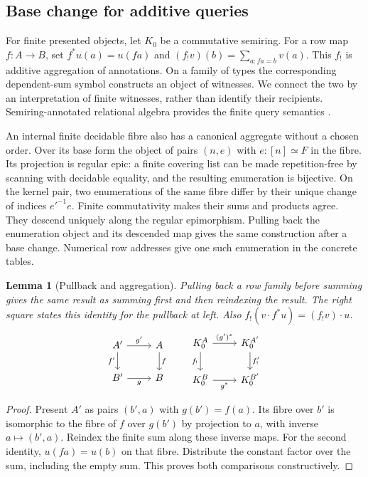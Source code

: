 \documentclass[11pt,a4paper]{article}
\newtheorem{lemma}[lemma]{Lemma}
\theoremstyle{definition}
\theoremstyle{remark}\newaliascnt{remark}{theorem}
\numberwithin{equation}{section}
\begin{document}
\subsection{Base change for additive queries}

For finite presented objects, let \(K_0\) be a commutative semiring. For a row map \(f:A\to B\), set \(f^*u(a)=u(fa)\) and
\((f_!v)(b)=\sum_{a:fa=b}v(a)\).
This \(f_!\) is additive aggregation of annotations. On a family of types the corresponding dependent-sum symbol constructs an object of witnesses. We connect the two by an interpretation of finite witnesses, rather than identify their recipients. Semiring-annotated relational algebra provides the finite query semantics \cite{green-provenance}.

An internal finite decidable fibre also has a canonical aggregate without a chosen order. Over its base form the object of pairs $(n,e)$ with $e:[n]\simeq F$ in the fibre. Its projection is regular epic: a finite covering list can be made repetition-free by scanning with decidable equality, and the resulting enumeration is bijective. On the kernel pair, two enumerations of the same fibre differ by their unique change of indices $e'^{-1}e$. Finite commutativity makes their sums and products agree. They descend uniquely along the regular epimorphism. Pulling back the enumeration object and its descended map gives the same construction after a base change. Numerical row addresses give one such enumeration in the concrete tables.

\begin{lemma}[Pullback and aggregation]\label{lem:bc}
Pulling back a row family before summing gives the same result as summing first and then reindexing the result. The right square states this identity for the pullback at left. Also \(f_!(v\cdot f^*u)=(f_!v)\cdot u\).
\[
\begin{tikzcd}
 A' \arrow[r,"g'"]\arrow[d,"f'"']& A\arrow[d,"f"]\\
 B'\arrow[r,"g"']&B
\end{tikzcd}
\qquad
\begin{tikzcd}
 K_0^{A}\arrow[r,"(g')^*"]\arrow[d,"f_!"']&
 K_0^{A'}\arrow[d,"f'_!"]\\
 K_0^{B}\arrow[r,"g^*"']&K_0^{B'}
\end{tikzcd}
\]
\end{lemma}
\begin{proof}
Present \(A'\) as pairs \((b',a)\) with \(g(b')=f(a)\). Its fibre over \(b'\) is isomorphic to the fibre of \(f\) over \(g(b')\) by projection to \(a\), with inverse \(a\mapsto(b',a)\). Reindex the finite sum along these inverse maps. For the second identity, \(u(fa)=u(b)\) on that fibre. Distribute the constant factor over the sum, including the empty sum. This proves both comparisons constructively.
\end{proof}
\end{document}
